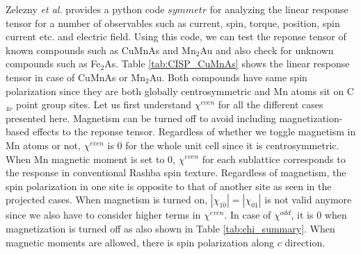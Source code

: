 \documentclass[10pt,doublespacing,edeposit]{uiucthesis2020}
\begin{document}
\begin{mainmatter}
Zelezny \emph{et al.} \cite{Zelezny2017} provides a python code $symmetr$ for analyzing the linear response tensor for a number of observables such as current, spin, torque, position, spin current etc. and electric field. Using this code, we can test the reponse tensor of known compounds such as CuMnAs and Mn$_2$Au and also check for unknown compounds such as Fe$_2$As. Table \ref{tab:CISP_CuMnAs} shows the linear response tensor in case of CuMnAs or Mn$_2$Au. Both compounds have same spin polarization since they are both globally centrosymmetric and Mn atoms sit on C$_{4v}$ point group sites. Let us first understand $\chi^{even}$ for all the different cases presented here. Magnetism can be turned off to avoid including magnetization-based effects to the reponse tensor. Regardless of whether we toggle magnetism in Mn atoms or not, $\chi^{even}$ is 0 for the whole unit cell since it is centrosymmetric. When Mn magnetic moment is set to 0, $\chi^{even}$ for each sublattice corresponds to the response in conventional Rashba spin texture. Regardless of magnetism, the spin polarization in one site is opposite to that of another site as seen in the projected cases. When magnetism is turned on, $|\chi_{10}| = |\chi_{01}|$ is not valid anymore since we also have to consider higher terms in $\chi^{even}$. In case of $\chi^{odd}$, it is 0 when magnetization is turned off as also shown in Table \ref{tab:chi_summary}. When magnetic moments are allowed, there is spin polarization along $c$ direction.


\end{mainmatter}
\end{document}
